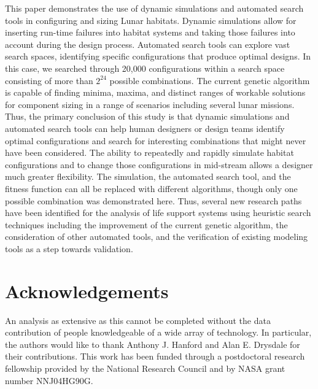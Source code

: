 \documentclass[submit]{aiaa}
\begin{document}
This paper demonstrates the use of dynamic simulations and automated
search tools in configuring and sizing Lunar habitats.  Dynamic
simulations allow for inserting run-time failures into habitat systems
and taking those failures into account during the design process.
Automated search tools can explore vast search spaces, identifying specific
configurations that produce optimal designs.  
In this case, we searched through 20,000 configurations within a search
space consisting of more than  $2^{24}$ possible combinations.
The current genetic algorithm is capable of finding minima, maxima, and distinct ranges of workable solutions for component sizing in a range of scenarios including several lunar missions.
Thus, the primary conclusion of this study is that dynamic simulations and automated search
tools can help human designers or design teams identify optimal
configurations and search for interesting combinations that might
never have been considered.   
The ability to repeatedly and rapidly simulate habitat configurations
and to change those configurations in mid-stream allows a designer much
greater flexibility.  
The simulation, the automated search tool, and the fitness function can all be
replaced with different algorithms, though only one possible combination was demonstrated here.
Thus, several new research paths have been identified for the analysis of life
support systems using heuristic search techniques including the improvement of the current genetic algorithm, the consideration of other automated tools, and the verification of existing modeling tools as a step towards validation.

\section{Acknowledgements}

An analysis as extensive as this cannot be completed without the data contribution of people knowledgeable of a wide array of technology.
In particular, the authors would like to thank Anthony J. Hanford and Alan E. Drysdale for their contributions.
This work has been funded through a postdoctoral research fellowship provided by the National Research Council and by NASA grant number NNJ04HG90G.
 


\end{document}
